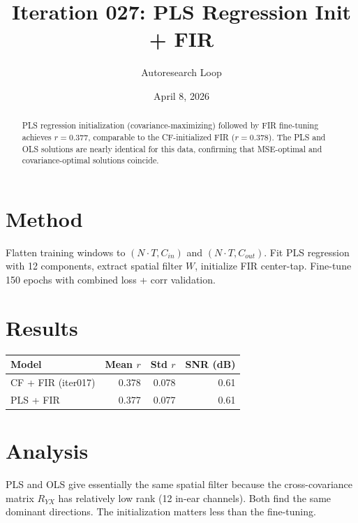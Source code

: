 \documentclass[11pt,a4paper]{article}
\title{Iteration 027: PLS Regression Init + FIR}
\author{Autoresearch Loop}
\date{April 8, 2026}
\begin{document}
\maketitle

\begin{abstract}
PLS regression initialization (covariance-maximizing) followed by FIR fine-tuning
achieves $r=0.377$, comparable to the CF-initialized FIR ($r=0.378$). The
PLS and OLS solutions are nearly identical for this data, confirming that
MSE-optimal and covariance-optimal solutions coincide.
\end{abstract}

\section{Method}
Flatten training windows to $(N \cdot T, C_{in})$ and $(N \cdot T, C_{out})$.
Fit PLS regression with 12 components, extract spatial filter $W$, initialize
FIR center-tap. Fine-tune 150 epochs with combined loss + corr validation.

\section{Results}
\begin{table}[H]
\centering
\begin{tabular}{lrrr}
\toprule
Model & Mean $r$ & Std $r$ & SNR (dB) \\
\midrule
CF + FIR (iter017) & 0.378 & 0.078 & 0.61 \\
PLS + FIR & 0.377 & 0.077 & 0.61 \\
\bottomrule
\end{tabular}
\end{table}

\section{Analysis}
PLS and OLS give essentially the same spatial filter because the cross-covariance
matrix $R_{YX}$ has relatively low rank (12 in-ear channels). Both find the
same dominant directions. The initialization matters less than the fine-tuning.
\end{document}
